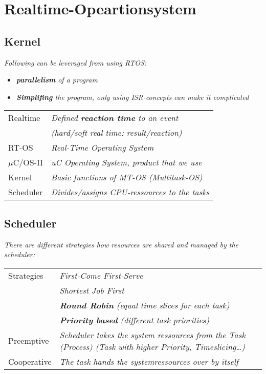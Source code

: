 \section{Realtime-Opeartionsystem}

\subsection{Kernel}

\textit{
    Following can be leveraged from using RTOS:
}

\begin{itemize}
    \item{\textit{
        \textbf{parallelism} of  a program
    }}
    \item{\textit{
        \textbf{Simplifing} the program, only using ISR-concepts can make it complicated
    }}
\end{itemize}

\begin{tabular}{lp{}}
    Realtime    & \textit{Defined \textbf{reaction time} to an event} \\
                & \textit{(hard/soft real time: result/reaction)} \\
    RT-OS       & \textit{Real-Time Operating System} \\
    $\mu$C/OS-II  & \textit{uC Operating System, product that we use} \\
    Kernel      & \textit{Basic functions of MT-OS (Multitask-OS)} \\
    Scheduler   & \textit{Divides/assigns CPU-ressources to the tasks} \\
\end{tabular}

\subsection{Scheduler}

\textit{There are different strategies how resources are shared and managed by the scheduler:}

\begin{tabular}{lp{}}
    Strategies      & \textit{First-Come First-Serve} \\
                    & \textit{Shortest Job First} \\
                    & \textit{\textbf{Round Robin} (equal time slices for each task)} \\
                    & \textit{\textbf{Priority based} (different task priorities)} \\
    Preemptive      & \textit{
                        Scheduler takes the system ressources from the
                        Task (Process) (Task with higher Priority,
                        Timeslicing…)
                    } \\
    Cooperative  & \textit{The task hands the systemressources over by itself} \\
\end{tabular}

